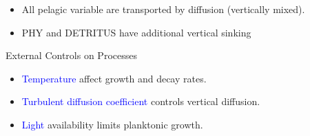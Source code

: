 \documentclass[final,xcolor=dvipsnames]{beamer}
\begin{document}
      
      \begin{frame}
	\begin{exampleblock}{}
	  \begin{itemize}
	    \item All pelagic variable are transported by diffusion (vertically mixed).  
	    \item PHY and DETRITUS have additional vertical sinking
	  \end{itemize} 
	\end{exampleblock}
      \end{frame}      
      
      \begin{frame}
	\begin{exampleblock}{External Controls on Processes}
	  \begin{itemize}
	    \item \textcolor<2>{blue}{Temperature} affect growth and decay rates.
	    \item \textcolor<2>{blue}{Turbulent diffusion coefficient} controls vertical diffusion.
	    \item \textcolor<2>{blue}{Light} availability limits planktonic growth.
	  \end{itemize} 
	\end{exampleblock}
      \end{frame}
      
      
      
      
\end{document}
